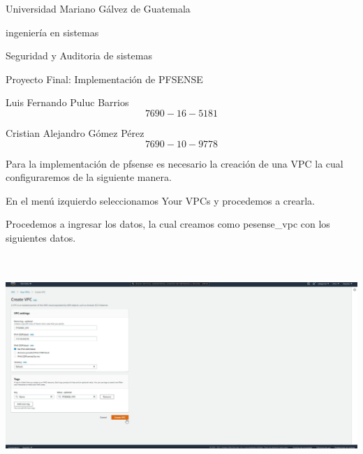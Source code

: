 \documentclass{article} %
\begin{document}


\noindent Universidad Mariano G\'{a}lvez de Guatemala

\noindent ingenier\'{i}a en sistemas

\noindent Seguridad y Auditoria de sistemas

\noindent Proyecto Final: Implementaci\'{o}n de PFSENSE 

\noindent 

\noindent Luis Fernando Puluc Barrios 
\[7690-16-5181\] 


\noindent Cristian Alejandro G\'{o}mez P\'{e}rez
\[7690-10-9778\] 


\noindent 

\noindent 

\noindent 

\noindent 

\noindent 

\noindent Para la implementaci\'{o}n de pfsense es necesario la creaci\'{o}n de una VPC la cual configuraremos de la siguiente manera. 

\noindent En el men\'{u} izquierdo seleccionamos Your VPCs y procedemos a crearla.

\noindent 

\noindent 

\noindent Procedemos a ingresar los datos, la cual creamos como pesense\_vpc con los siguientes datos.

\noindent 

\noindent 

\noindent \includegraphics*[width=6.19in, height=3.30in, trim=0.02in 0.15in 1.07in 0.00in]{image1}

\noindent 
\end{document}
